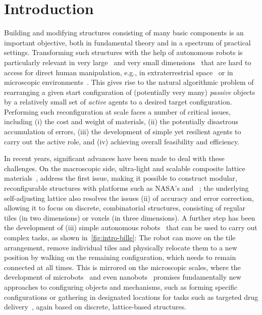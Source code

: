 \section{Introduction}\label{sec:introduction}
Building and modifying structures consisting of many basic components is an
important objective, both in fundamental theory and in a spectrum of practical settings.
Transforming such structures with the help of autonomous robots is
particularly relevant in very large~\cite{2020-Coordinating_IWOCA} and
very small dimensions~\cite{Yangsheng:five_mm_robot}
that are hard to access for direct human manipulation, e.g.,
in extraterrestrial space~\cite{BENLARBI20213598,jenett2017design} or in microscopic environments~\cite{bfh+-cgur-17}.
This gives rise to the natural algorithmic problem of rearranging a
given start configuration of (potentially very many) \emph{passive} objects
by a relatively small set of \emph{active} agents to a desired target configuration.
Performing such reconfiguration at scale faces a number of critical issues,
including (i) the cost and weight of materials, (ii) the potentially disastrous
accumulation of errors, (iii) the development of simple yet resilient agents to carry
out the active role, and (iv) achieving overall feasibility and efficiency.

In recent years, significant advances have been made to deal with these
challenges. On the macroscopic side, ultra-light and scalable composite lattice
materials~\cite{Cheung1219,ultralight24,gregg2018ultra}, address the first
issue, making it possible to construct modular, reconfigurable
structures with platforms such as NASA's \BILLE and \ARMADAS~\cite{jenett2016meso,jenett2017bille,ultralight24}; the underlying self-adjusting lattice
also resolves the issues (ii) of accuracy and error correction,
allowing it to focus on discrete, combinatorial structures,
consisting of regular tiles (in two dimensions) or voxels (in three dimensions).
A further step has been the development of (iii) simple autonomous
robots~\cite{9836082,jenett2019material}
that can be used to carry out complex tasks,
as shown in~\cref{fig:intro-bille}: The robot can move on the tile arrangement, remove
individual tiles and physically relocate them to a new position by walking on
the remaining configuration, which needs to remain connected at all times.
This is mirrored on the microscopic scales, where the development of
microbots~\cite{zhang2019robotic} and even nanobots~\cite{santos2022light}
promises fundamentally new approaches to configuring objects
and mechanisms, such as forming specific configurations or gathering
in designated locations for tasks such as targeted drug
delivery~\cite{2020-Targeted_ICRA,2022-gather_IROS}, again based on
discrete, lattice-based structures.

